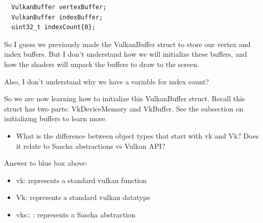 \documentclass{article}
\begin{document}
\begin{verbatim}
  VulkanBuffer vertexBuffer;
  VulkanBuffer indexBuffer;
  uint32_t indexCount{0};
\end{verbatim}
\begin{tcolorbox}[
  enhanced,
  breakable,
  colback=orange!5,
  colframe=orange!75!black,
  sharp corners=all,
  boxrule=0.8pt,
  left=5pt,
  right=5pt,
  top=6pt,
  bottom=6pt,
  parbox=false
]
\par So I guess we previously made the VulkanBuffer struct to store our
vertex and index buffers. But I don't understand how we will
initialize these buffers, and how the shaders will unpack the buffers
to draw to the screen.

\par Also, I don't understand why we have a variable for index count?
\end{tcolorbox}

\begin{tcolorbox}[
  enhanced,
  breakable,
  colback=green!5,
  colframe=green!45!black,
  sharp corners=all,
  boxrule=0.8pt,
  left=5pt,
  right=5pt,
  top=6pt,
  bottom=6pt,
  parbox=false
]
\par So we are now learning how to initialize this VulkanBuffer struct.
Recall this struct has two parts: VkDeviceMemory and VkBuffer. See
the subsection on initializing buffers to learn more.
\end{tcolorbox}

\begin{tcolorbox}[
  enhanced,
  breakable,
  colback=blue!3,
  colframe=blue!60!black,
  sharp corners=all,
  boxrule=0.8pt,
  left=5pt,
  right=5pt,
  top=6pt,
  bottom=6pt,
  parbox=false
]
\begin{itemize}
  \item What is the difference between object types that start with
    vk and Vk? Does it relate to Sascha abstractions vs Vulkan API?
\end{itemize}
\end{tcolorbox}
\begin{tcolorbox}[
  enhanced,
  breakable,
  colback=green!5,
  colframe=green!45!black,
  sharp corners=all,
  boxrule=0.8pt,
  left=5pt,
  right=5pt,
  top=6pt,
  bottom=6pt,
  parbox=false
]
Answer to blue box above:
\begin{itemize}
  \item vk: represents a standard vulkan function
  \item Vk: represents a standard vulkan datatype
  \item vks:: : represents a Sascha abstraction
\end{itemize}
\end{tcolorbox}
\end{document}
